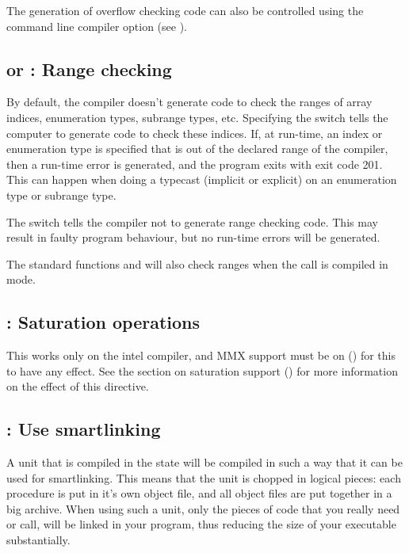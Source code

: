 The generation of overflow checking code can also be controlled
using the  command line compiler option (see \userref).

\subsection{ or  : Range checking}

By default, the compiler doesn't generate code to check the ranges of array
indices, enumeration types, subrange types, etc. Specifying the
 switch tells the computer to generate code to check these
indices. If, at run-time, an index or enumeration type is specified that is
out of the declared range of the compiler, then a run-time error is
generated, and the program exits with exit code 201. This can happen when
doing a typecast (implicit or explicit) on an enumeration type or subrange
type.

The  switch tells the compiler not to generate range checking
code. This may result in faulty program behaviour, but no run-time errors
will be generated.

\begin{remark}The standard functions  and  will also check ranges
when the call is compiled in  mode.
\end{remark}

\subsection{ : Saturation operations}

This works only on the intel compiler, and MMX support must be on
() for this to have any effect. See the section on
saturation support () for more information
on the effect of this directive.

\subsection{ : Use smartlinking}

A unit that is compiled in the  state will be
compiled in such a way that it can be used for smartlinking. This means that
the unit is chopped in logical pieces: each procedure is put in it's own
object file, and all object files are put together in a big archive. When
using such a unit, only the pieces of code that you really need or call,
will be linked in your program, thus reducing the size of your executable
substantially.

